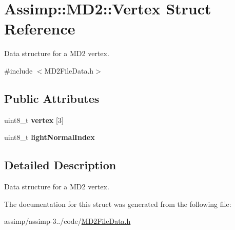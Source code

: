 \hypertarget{struct_assimp_1_1_m_d2_1_1_vertex}{\section{Assimp\+:\+:M\+D2\+:\+:Vertex Struct Reference}
\label{struct_assimp_1_1_m_d2_1_1_vertex}
}


Data structure for a M\+D2 vertex.  




{\ttfamily \#include $<$M\+D2\+File\+Data.\+h$>$}

\subsection*{Public Attributes}
\begin{DoxyCompactItemize}
\item 
\hypertarget{struct_assimp_1_1_m_d2_1_1_vertex_a91a07777ef1fd7c40fada2e25ed1bb2c}{uint8\+\_\+t {\bfseries vertex} \mbox{[}3\mbox{]}}\label{struct_assimp_1_1_m_d2_1_1_vertex_a91a07777ef1fd7c40fada2e25ed1bb2c}

\item 
\hypertarget{struct_assimp_1_1_m_d2_1_1_vertex_ab548761b860125618818031d40eed78b}{uint8\+\_\+t {\bfseries light\+Normal\+Index}}\label{struct_assimp_1_1_m_d2_1_1_vertex_ab548761b860125618818031d40eed78b}

\end{DoxyCompactItemize}


\subsection{Detailed Description}
Data structure for a M\+D2 vertex. 

The documentation for this struct was generated from the following file\+:\begin{DoxyCompactItemize}
\item 
assimp/assimp-\/3../code/\hyperlink{_m_d2_file_data_8h}{M\+D2\+File\+Data.\+h}\end{DoxyCompactItemize}
